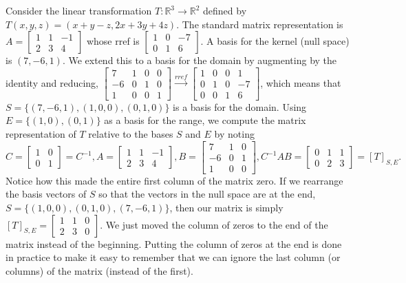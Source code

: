 \begin{example}\label{ltbasis1}
Consider the linear transformation $T\colon{\mathbb{R}}^3\to {\mathbb{R}}^2$ defined by $T(x,y,z)=(x+y-z,2x+3y+4z)$. The standard matrix representation is 
$
A=
\begin{bmatrix}
 1 & 1 & -1 \\
 2 & 3 & 4
\end{bmatrix}
$
whose rref is
$
\begin{bmatrix}
 1 & 0 & -7 \\
 0 & 1 & 6
\end{bmatrix}
$. A basis for the kernel (null space) is $(7,-6,1)$. We extend this to a basis for the domain by augmenting by the identity and reducing, 
$
\begin{bmatrix}
 7 & 1 & 0 & 0 \\
 -6 & 0 & 1 & 0 \\
 1 & 0 & 0 & 1
\end{bmatrix}
\xrightarrow{rref}
\begin{bmatrix}
 1 & 0 & 0 & 1 \\
 0 & 1 & 0 & -7 \\
 0 & 0 & 1 & 6
\end{bmatrix}
$, which means that $S=\{(7,-6,1),(1,0,0),(0,1,0)\}$ is a basis for the domain. Using $E=\{(1,0),(0,1)\}$ as a basis for the range, we compute the matrix representation of $T$ relative to the bases $S$ and $E$ by noting 
$$C=
\begin{bmatrix}
1 & 0\\
0 & 1
\end{bmatrix}=C^{-1},
A=
\begin{bmatrix}
 1 & 1 & -1 \\
 2 & 3 & 4
\end{bmatrix}, 
B=
\begin{bmatrix}
 7 & 1 & 0 \\
 -6 & 0 & 1 \\
 1 & 0 & 0
\end{bmatrix},
C^{-1}AB= 
\begin{bmatrix}
 0 & 1 & 1 \\
 0 & 2 & 3
\end{bmatrix} = [T]_{S,E}.$$ 
Notice how this made the entire first column of the matrix zero. If we rearrange the basis vectors of $S$ so that the vectors in the null space are at the end, $S=\{(1,0,0),(0,1,0),(7,-6,1)\}$, then our matrix is simply $[T]_{S,E} = \begin{bmatrix}
 1 & 1 &0\\
 2 & 3 &0
\end{bmatrix}$. We just moved the column of zeros to the end of the matrix instead of the beginning. Putting the column of zeros at the end is done in practice to make it easy to remember that we can ignore the last column (or columns) of the matrix (instead of the first).

\end{example}

